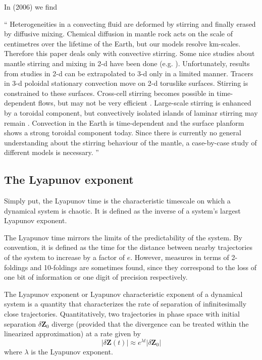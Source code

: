 In \textcite{gowh06} (2006) we find
\begin{displayquote}
{\color{darkgray}
``
Heterogeneities in a convecting ﬂuid are deformed by
stirring and ﬁnally erased by diffusive mixing. Chemical diﬀusion in mantle rock
acts on the scale of centimetres over the lifetime of the Earth, but our models
resolve km-scales. Therefore this paper deals only with convective stirring. Some
nice studies about mantle stirring and mixing in 2-d have been done (e.g. 
\cite{chri89,guda86b,kest91,ketu90,mebo95,olyb84,olyb84b,teyl96,teyp97,tepy98}).
Unfortunately, results from studies in 2-d can be extrapolated to 3-d only in a limited
manner. Tracers in 3-d poloidal stationary convection move on 2-d toruslike
surfaces. Stirring is constrained to these surfaces. Cross-cell stirring becomes possible
in time-dependent ﬂows, but may not be very efficient \cite{schh96}. Large-scale stirring is
enhanced by a toroidal component, but convectively isolated islands of laminar
stirring may remain \cite{feri98}. Convection in the Earth is time-dependent and the surface
planform shows a strong toroidal component today. Since there is currently no
general understanding about the stirring behaviour of the mantle, a case-by-case
study of different models is necessary.
''
}
\end{displayquote}




\subsection{The Lyapunov exponent}


Simply put, the Lyapunov time is the characteristic timescale on which a dynamical system is chaotic.
 It is defined as the inverse of a system's largest Lyapunov exponent.

The Lyapunov time mirrors the limits of the predictability of the system. By convention, it is defined 
as the time for the distance between nearby trajectories of the system to increase by a factor of $e$. 
However, measures in terms of 2-foldings and 10-foldings are sometimes found, since they correspond to 
the loss of one bit of information or one digit of precision respectively.

The Lyapunov exponent or Lyapunov characteristic exponent of a dynamical system is a quantity 
that characterizes the rate of separation of infinitesimally close trajectories. 
Quantitatively, two trajectories in phase space with initial separation $\delta \mathbf{Z}_0$ 
diverge (provided that the divergence can be treated within the linearized approximation) at a rate given by
\[
|\delta \mathbf{Z} (t)|\approx e^{\lambda t}|\delta \mathbf {Z} _{0}| 
\]
where $\lambda$ is the Lyapunov exponent. 

